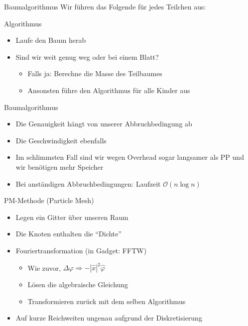 \documentclass{beamer}
\begin{document}
\begin{frame}{Baumalgorithmus}
  Wir führen das Folgende für jedes Teilchen aus:
  \begin{block}{Algorithmus}
    \begin{itemize}
      \item Laufe den Baum herab \pause
      \item Sind wir weit genug weg oder bei einem Blatt? \pause
        \begin{itemize}
          \item Falls ja: Berechne die Masse des Teilbaumes
          \item Ansonsten führe den Algorithmus für alle Kinder aus
        \end{itemize}
    \end{itemize}
  \end{block}
\end{frame}

\begin{frame}{Baumalgorithmus}
  \begin{itemize}
    \item Die Genauigkeit hängt von unserer Abbruchbedingung ab \pause
    \item Die Geschwindigkeit ebenfalls \pause
    \item Im schlimmsten Fall sind wir wegen Overhead sogar langsamer als PP
      und wir benötigen mehr Speicher
      \pause
      \vskip20pt
    \item Bei anständigen Abbruchbedingungen: Laufzeit $\mathcal{O}(n\log n)$
  \end{itemize}
\end{frame}

\begin{frame}{PM-Methode (Particle Mesh)}
  \begin{itemize}
    \item Legen ein Gitter über unseren Raum
    \item Die Knoten enthalten die "`Dichte"'
      \pause
    \item Fouriertransformation (in Gadget: FFTW)
      \begin{itemize}
        \item Wie zuvor, $\Delta \varphi \Rightarrow
          -\left|\hat{x}\right|^2\hat{\varphi}$
        \item Lösen die algebraische Gleichung
        \item Transformieren zurück mit dem selben Algorithmus
      \end{itemize}
      \pause
    \item Auf kurze Reichweiten ungenau aufgrund der Diskretisierung
  \end{itemize}
\end{frame}
\end{document}
